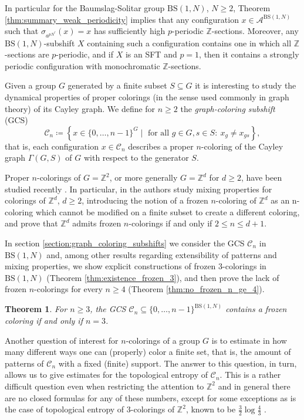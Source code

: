 \documentclass[cupthm,crop,info]{CUP-JNL-ETS}%
\theoremstyle{cupplain}
\newtheorem{theorem}{Theorem}[section]
\theoremstyle{cupdefinition}
\theoremstyle{cupremark}
\theoremstyle{cupproof}
\numberwithin{equation}{section}
\newcommand{\BS}[1][N]{\mathrm{BS}(1,#1)}
\begin{document}
In particular for the Baumslag-Solitar group $\BS$, $N\ge 2$, Theorem \ref{thm:summary_weak_periodicity} implies that any configuration $x\in \mathcal{A}^{\BS}$ such that $\sigma_{a^{pN^\ell}}(x)=x$ has sufficiently high $p$-periodic $\mathbb{Z}$-sections. Moreover, any $\BS$-subshift $X$ containing such a configuration contains one in which all $\mathbb{Z}$-sections are $p$-periodic, and if $X$ is an SFT and $p=1$, then it contains a strongly periodic configuration with monochromatic $\mathbb{Z}$-sections.


Given a group $G$ generated by a finite subset $S\subseteq G$ it is interesting to study the dynamical properties of proper colorings (in the sense used commonly in graph theory) of its Cayley graph. We define for $n\ge 2$ the \textit{graph-coloring subshift} (GCS)
$$
\mathcal{C}_{n}\coloneqq\left\{x\in \{0,\ldots,n-1\}^G\mid \text{ for all } g\in G, s\in S: \ x_{g}\neq x_{gs} \right\},
$$
that is, each configuration $x\in \mathcal{C}_{n}$ describes a proper $n$-coloring of the Cayley graph $\Gamma(G,S)$ of $G$ with respect to the generator $S$. 

Proper $n$-colorings of $G=\mathbb{Z}^2$, or more generally $G=\mathbb{Z}^d$ for $d\ge 2$, have been studied recently \cite{alon2019mixing, peled2018rigidity, ray2020proper}. In particular, in \cite{alon2019mixing} the authors study mixing properties for colorings of $\mathbb{Z}^d$, $d\ge 2$, introducing the notion of a frozen $n$-coloring of $\mathbb{Z}^d$ as an n-coloring which cannot be modified on a finite subset to create a different coloring, and prove that $\mathbb{Z}^d$ admits frozen $n$-colorings if and only if $2\le n\le d+1$. 


In section \ref{section:graph_coloring_subshifts} we consider the GCS $\mathcal{C}_n$ in $\BS$ and, among other results regarding extensibility of patterns and mixing properties, we show explicit constructions of frozen $3$-colorings in $\BS$ (Theorem \ref{thm:existence_frozen_3}), and then prove the lack of frozen $n$-colorings for every $n\ge 4$ (Theorem \ref{thm:no_frozen_n_ge_4}).

\begin{theorem}\label{thm:summary_gcs_frozen_colorings}
	For $n\ge 3$, the GCS $\mathcal{C}_n\subseteq\{0,\ldots,n-1\}^{\BS}$ contains a frozen coloring if and only if $n=3$.
\end{theorem}	

Another question of interest for $n$-colorings of a group $G$ is to estimate in how many different ways one can (properly) color a finite set, that is, the amount of patterns of $\mathcal{C}_n$ with a fixed (finite) support. The answer to this question, in turn, allows us to give estimates for the topological entropy of $\mathcal{C}_n$. This is a rather difficult question even when restricting the attention to $\mathbb{Z}^2$ and in general there are no closed formulas for any of these numbers, except for some exceptions as is the case of topological entropy of $3$-colorings of $\mathbb{Z}^2$, known to be $\frac{3}{2}\log\frac{4}{3}$ \cite{Lieb:1967zz}.
\end{document}
